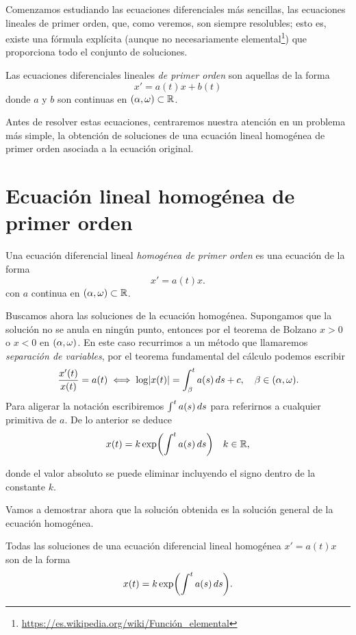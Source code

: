\documentclass[../ecuaciones_diferenciales.tex]{subfiles}
\begin{document}
Comenzamos estudiando las ecuaciones diferenciales más sencillas, las ecuaciones
lineales de primer orden, que, como veremos, son siempre resolubles; esto es,
existe una fórmula explícita (aunque no necesariamente
elemental\footnote{\url{https://es.wikipedia.org/wiki/Función_elemental}}) que
proporciona todo el conjunto de soluciones.

\begin{definition}
	Las ecuaciones diferenciales lineales \emph{de primer orden} son aquellas de
	la forma
	\[x' = a(t)x + b(t)\]
	donde \(a\) y \(b\) son continuas en \(\openopen{\alpha}{\omega} \subset \R\).
\end{definition}

Antes de resolver estas ecuaciones, centraremos nuestra atención en un problema
más simple, la obtención de soluciones de una ecuación lineal homogénea de
primer orden asociada a la ecuación original.

\section{Ecuación lineal homogénea de primer orden}\label{sec:hom}

\begin{definition}
	Una ecuación diferencial lineal \emph{homogénea de primer orden} es una
	ecuación de la forma
	\[x' = a(t)x.\]
	con \(a\) continua en \(\openopen{\alpha}{\omega} \subset \R\).
\end{definition}

Buscamos ahora las soluciones de la ecuación homogénea. Supongamos que la
solución no se anula en ningún punto, entonces por el teorema de Bolzano
\(x > 0\) o \(x < 0\) en \(\openopen{\alpha}{\omega}\). En este caso recurrimos a un
método que llamaremos \emph{separación de variables}, por el teorema fundamental
del cálculo podemos escribir
\[\frac{x'(t)}{x(t)} = a(t) \iff \log\abs{x(t)}
	= \int_{\beta}^t a(s) \dif s + c,
	\quad \beta \in (\alpha, \omega).\]
Para aligerar la notación escribiremos \(\int^t a(s) \mathop{d\!} s\) para referirnos
a cualquier primitiva de \(a\). De lo anterior se deduce
\[x(t) = k \expf{\int^t a(s) \dif s} \quad k \in \R,\]

donde el valor absoluto se puede eliminar incluyendo el signo dentro de la
constante \(k\).

Vamos a demostrar ahora que la solución obtenida es la solución general de la
ecuación homogénea.

\begin{theorem}\label{thm:sol_gen}
	Todas las soluciones de una ecuación diferencial lineal homogénea
	\(x' = a(t)x\) son de la forma
	\begin{equation}\label{eq:sol_eq_lin_hom_1_ord}
		x(t) = k \expf{\int^t a(s) \dif s}.
	\end{equation}
\end{theorem}
\end{document}
